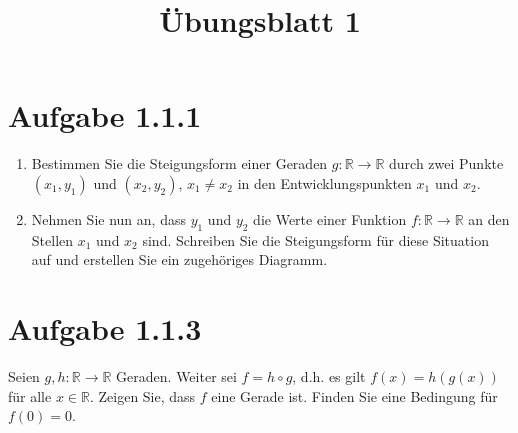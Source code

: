 \documentclass[a4paper]{article}
\title{Übungsblatt 1}
\date{}
\author{}
\newcommand*{\R}{\mathbb R}
\begin{document}
\maketitle

\section{Aufgabe 1.1.1}

\begin{enumerate}
  \item Bestimmen Sie die Steigungsform einer Geraden $g:\R\to\R$ durch zwei Punkte $(x_1,y_1)$ und $(x_2,y_2)$, $x_1\neq x_2$ in den Entwicklungspunkten $x_1$ und $x_2$.

  \item Nehmen Sie nun an, dass $y_1$ und $y_2$ die Werte einer Funktion $f:\R\to\R$ an den Stellen $x_1$ und $x_2$ sind. Schreiben Sie die Steigungsform für diese Situation auf und erstellen Sie ein zugehöriges Diagramm.
\end{enumerate}

\section{Aufgabe 1.1.3}

Seien $g,h:\R\to\R$ Geraden. Weiter sei $f=h\circ g$, d.h. es gilt $f(x)=h(g(x))$ für alle $x\in\R$. Zeigen Sie, dass $f$ eine Gerade ist. Finden Sie eine Bedingung für $f(0)=0$.
\end{document}
